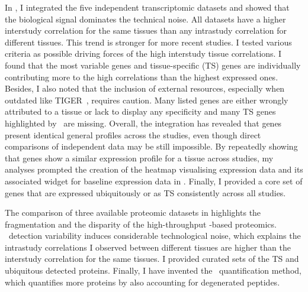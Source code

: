 In ,
I integrated the five independent transcriptomic datasets and
showed that the biological signal dominates the technical noise.
All datasets have a higher interstudy correlation for the same tissues
than any intrastudy correlation for different tissues.
This trend is stronger for more recent studies.
I tested various criteria as possible driving forces
of the high interstudy tissue correlations.
I found that the most variable genes and tissue-specific (\gls{TS}) genes
are individually contributing more to the high correlations
than the highest expressed ones.
Besides, I also noted that
the inclusion of external resources,
especially when outdated like \gls{TIGER}~,
requires caution.
Many listed genes are either wrongly attributed to a tissue
or lack to display any specificity and
many \gls{TS} genes highlighted by \Rnaseq\ are missing.
Overall, the integration has revealed that
genes present identical general profiles across the studies,
even though direct comparisons of independent data may be still impossible.
By repeatedly showing that
genes show a similar expression profile for a tissue across studies,
my analyses prompted the creation of the heatmap visualising expression data
and its associated widget for baseline expression data in
.
Finally, I provided a core set of genes that are expressed
ubiquitously or as \gls{TS} consistently across all studies.\mybr\

The comparison of three available proteomic datasets
in  highlights
the fragmentation and the disparity of the high-throughput \ms{}-based proteomics.
\ms\ detection variability induces considerable technological noise,
which explains
the intrastudy correlations I observed between different tissues are
higher than the interstudy correlation for the same tissues.
I provided curated sets of the \gls{TS} and ubiquitous detected proteins.
Finally, I have invented the \PPKM\ quantification method,
which quantifies more proteins by also accounting for degenerated peptides.\mybr\

